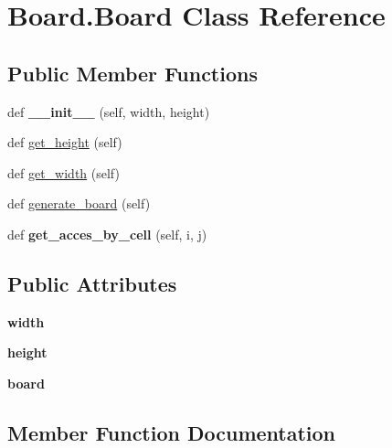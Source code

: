 \hypertarget{class_board_1_1_board}{}\section{Board.\+Board Class Reference}
\label{class_board_1_1_board}
\subsection*{Public Member Functions}
\begin{DoxyCompactItemize}
\item 
\mbox{\label{class_board_1_1_board_a4e5fe775dd732dca12ba2f24f5e33cd0}} 
def {\bfseries \+\_\+\+\_\+init\+\_\+\+\_\+} (self, width, height)
\item 
def \hyperlink{class_board_1_1_board_a6134b116a4421868d9b70a90cae3cf6a}{get\+\_\+height} (self)
\item 
def \hyperlink{class_board_1_1_board_a5461757505c80b532af77cc6a651c7a7}{get\+\_\+width} (self)
\item 
def \hyperlink{class_board_1_1_board_a6c6aa64d586b48c8cbf7942a28ef4fba}{generate\+\_\+board} (self)
\item 
\mbox{\label{class_board_1_1_board_a8c672c7842189de03079a86c757244d7}} 
def {\bfseries get\+\_\+acces\+\_\+by\+\_\+cell} (self, i, j)
\end{DoxyCompactItemize}
\subsection*{Public Attributes}
\begin{DoxyCompactItemize}
\item 
\mbox{\label{class_board_1_1_board_a354a175ae1f399098ac23ed37c58a3f2}} 
{\bfseries width}
\item 
\mbox{\label{class_board_1_1_board_a288daa852b69c17ecbabab9af6dac15a}} 
{\bfseries height}
\item 
\mbox{\label{class_board_1_1_board_ad18dab28d51fbe8bbf93036546741a0b}} 
{\bfseries board}
\end{DoxyCompactItemize}


\subsection{Member Function Documentation}
\mbox{\label{class_board_1_1_board_a6c6aa64d586b48c8cbf7942a28ef4fba}} 
